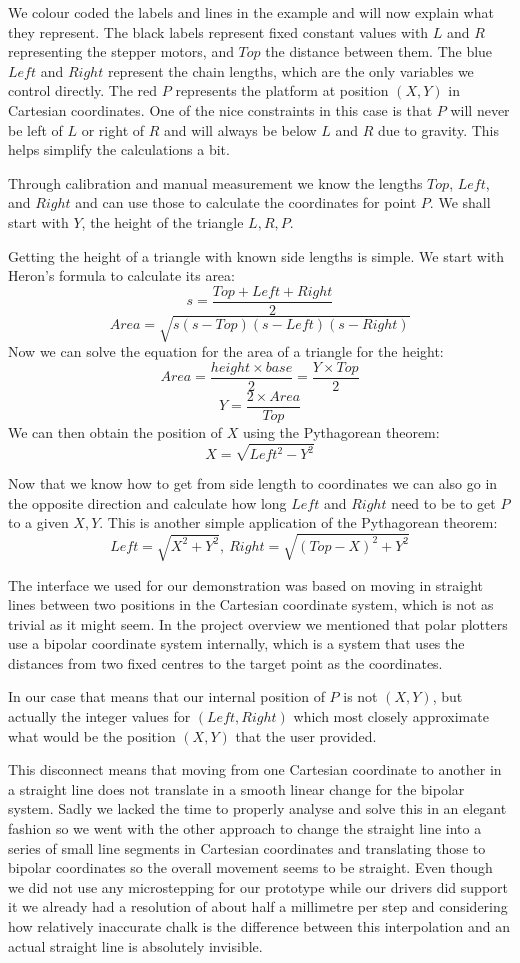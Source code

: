 \documentclass[12pt]{article}
\begin{document}
We colour coded the labels and lines in the example and will now
explain what they represent.
The black labels represent fixed constant values with $L$ and $R$
representing the stepper motors, and $Top$ the distance between them.
The blue $Left$ and $Right$ represent the chain lengths, which are
the only variables we control directly.
The red $P$ represents the platform at position $(X,Y)$ in Cartesian
coordinates.
One of the nice constraints in this case is that $P$ will never be
left of $L$ or right of $R$ and will always be below $L$ and $R$ due
to gravity. This helps simplify the calculations a bit.

Through calibration and manual measurement we know the lengths $Top$,
$Left$, and $Right$ and can use those to calculate the coordinates
for point $P$.
We shall start with $Y$, the height of the triangle $L,R,P$.

Getting the height of a triangle with known side lengths is simple.
We start with Heron's formula to calculate its area:
$$s = \frac{Top + Left + Right}{2}$$
$$Area = \sqrt{s(s-Top)(s-Left)(s-Right)}$$
%
Now we can solve the equation for the area of a triangle for the height:
$$Area = \frac{height \times base}{2} = \frac{Y \times Top}{2}$$
$$Y = \frac{2 \times Area}{Top}$$
%
We can then obtain the position of $X$ using the Pythagorean theorem:
$$X = \sqrt{Left^2 - Y^2}$$

Now that we know how to get from side length to coordinates we can
also go in the opposite direction and calculate how long $Left$ and
$Right$ need to be to get $P$ to a given $X,Y$.
This is another simple application of the Pythagorean theorem:
$$Left = \sqrt{X^2 + Y^2},\ Right = \sqrt{(Top - X)^2 + Y^2}$$

The interface we used for our demonstration was based on moving
in straight lines between two positions in the Cartesian coordinate
system, which is not as trivial as it might seem.
In the project overview we mentioned that polar plotters use a
bipolar coordinate system internally, which is a system that uses
the distances from two fixed centres to the target point as the
coordinates.

In our case that means that our internal position of $P$ is not
$(X,Y)$, but actually the integer values for $(Left,Right)$
which most closely approximate what would be the position $(X,Y)$
that the user provided.

This disconnect means that moving from one Cartesian coordinate
to another in a straight line does not translate in a smooth linear
change for the bipolar system.
Sadly we lacked the time to properly analyse and solve this in an
elegant fashion so we went with the other approach to change the
straight line into a series of small line segments in Cartesian
coordinates and translating those to bipolar coordinates so the
overall movement seems to be straight.
Even though we did not use any microstepping for our prototype
while our drivers did support it we already had a resolution of
about half a millimetre per step and considering how relatively
inaccurate chalk is the difference between this interpolation
and an actual straight line is absolutely invisible.
\end{document}
